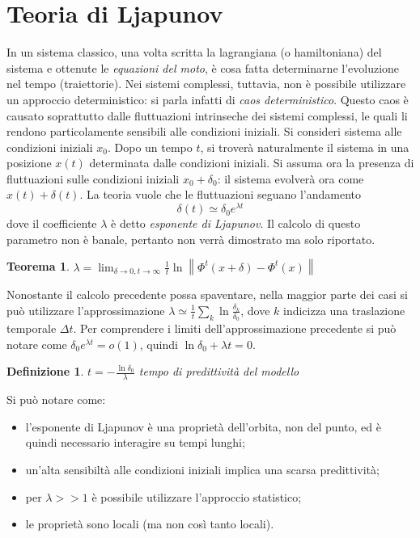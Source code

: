 \documentclass[12pt, a4paper]{book}
\theoremstyle{theorem}
\newtheorem{definition}{Definizione}[section]
\newtheorem{theorem}{Teorema}[section]
\begin{document}
		\section{Teoria di Ljapunov}
			In un sistema classico, una volta scritta la lagrangiana (o hamiltoniana) del sistema e ottenute le \emph{equazioni del moto}, è cosa fatta determinarne l'evoluzione nel tempo (traiettorie).
			Nei sistemi complessi, tuttavia, non è possibile utilizzare un approccio deterministico: si parla infatti di \emph{caos deterministico}.
			Questo caos è causato soprattutto dalle fluttuazioni intrinseche dei sistemi complessi, le quali li rendono particolamente sensibili alle condizioni iniziali.
			Si consideri sistema alle condizioni iniziali $x_{0}$.
			Dopo un tempo $t$, si troverà naturalmente il sistema in una posizione $x(t)$ determinata dalle condizioni iniziali.
			Si assuma ora la presenza di fluttuazioni sulle condizioni iniziali $x_{0}+\delta_{0}$: il sistema evolverà ora come $x(t)+\delta(t)$.
			La teoria vuole che le fluttuazioni seguano l'andamento
			\begin{equation*}
				\delta(t)\simeq\delta_{0}e^{\lambda t}
			\end{equation*}
			dove il coefficiente $\lambda$ è detto \emph{esponente di Ljapunov}.
			Il calcolo di questo parametro non è banale, pertanto non verrà dimostrato ma solo riportato.
			\begin{theorem}
				$\lambda=\lim_{\delta\to0,t\to\infty}\frac{1}{t}\ln\left\lVert \Phi^{t}(x+\delta)-\Phi^{t}(x) \right\rVert$
			\end{theorem}
			Nonostante il calcolo precedente possa spaventare, nella maggior parte dei casi si può utilizzare l'approssimazione $\lambda\simeq\frac{1}{t}\sum_{k}\ln\frac{\delta_{k}}{\delta_{0}}$, dove $k$ indicizza una traslazione temporale $\Delta t$. 
			Per comprendere i limiti dell'approssimazione precedente si può notare come $\delta_{0}e^{\lambda t}=o(1)$, quindi $\ln\delta_{0}+\lambda t=0$.
			\begin{definition}
				$t=-\frac{\ln\delta_{0}}{\lambda}$ tempo di predittività del modello	
			\end{definition}
			Si può notare come:
			\begin{itemize}
				\item l'esponente di Ljapunov è una proprietà dell'orbita, non del punto, ed è quindi necessario interagire su tempi lunghi;
				\item un'alta sensibiltà alle condizioni iniziali implica una scarsa predittività;
				\item per $\lambda>>1$ è possibile utilizzare l'approccio statistico;
				\item le proprietà sono locali (ma non così tanto locali).
			\end{itemize}
\end{document}
